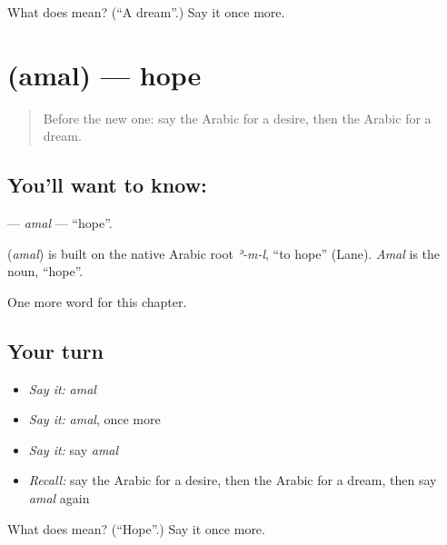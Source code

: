 \begin{tcolorbox}[breakable,colback=teal!4,colframe=teal!35!black,title={Before you move on}]
What does  mean? (\textquotedblleft{}A dream\textquotedblright{}.) Say it once more.
\end{tcolorbox}
\section[\texorpdfstring{\ar{أمل} (amal)}{أمل (amal)}]{ (amal) — hope}

\label{lesson:AR-C113-amal}



\begin{quote}
Before the new one: say the Arabic for a desire, then the Arabic for a dream.
\end{quote}

\subsection*{You'll want to know: }
\textbf{} — \emph{amal} — \textquotedblleft{}hope\textquotedblright{}.

\begin{cousinweb}
\textbf{} (\emph{amal}) is built on the native Arabic root \emph{ʾ-m-l}, \textquotedblleft{}to hope\textquotedblright{} (Lane). \emph{Amal} is the noun, \textquotedblleft{}hope\textquotedblright{}.
\end{cousinweb}

\begin{grammarlens}[title={What you've built}]
One more word for this chapter.
\end{grammarlens}

\subsection*{Your turn}
\begin{itemize}
\raggedright
  \item \emph{Say it:} \emph{amal}
  \item \emph{Say it:} \emph{amal}, once more
  \item \emph{Say it:} say \emph{amal}
  \item \emph{Recall:} say the Arabic for a desire, then the Arabic for a dream, then say \emph{amal} again
\end{itemize}

\begin{tcolorbox}[breakable,colback=teal!4,colframe=teal!35!black,title={Before you move on}]
What does  mean? (\textquotedblleft{}Hope\textquotedblright{}.) Say it once more.
\end{tcolorbox}

